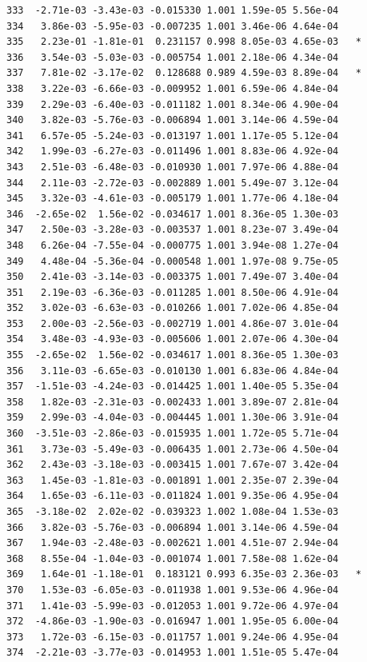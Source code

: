 \documentclass[
  letterpaper,
  DIV=11,
  numbers=noendperiod]{scrartcl}
\begin{document}
\begin{verbatim}
333  -2.71e-03 -3.43e-03 -0.015330 1.001 1.59e-05 5.56e-04    
334   3.86e-03 -5.95e-03 -0.007235 1.001 3.46e-06 4.64e-04    
335   2.23e-01 -1.81e-01  0.231157 0.998 8.05e-03 4.65e-03   *
336   3.54e-03 -5.03e-03 -0.005754 1.001 2.18e-06 4.34e-04    
337   7.81e-02 -3.17e-02  0.128688 0.989 4.59e-03 8.89e-04   *
338   3.22e-03 -6.66e-03 -0.009952 1.001 6.59e-06 4.84e-04    
339   2.29e-03 -6.40e-03 -0.011182 1.001 8.34e-06 4.90e-04    
340   3.82e-03 -5.76e-03 -0.006894 1.001 3.14e-06 4.59e-04    
341   6.57e-05 -5.24e-03 -0.013197 1.001 1.17e-05 5.12e-04    
342   1.99e-03 -6.27e-03 -0.011496 1.001 8.83e-06 4.92e-04    
343   2.51e-03 -6.48e-03 -0.010930 1.001 7.97e-06 4.88e-04    
344   2.11e-03 -2.72e-03 -0.002889 1.001 5.49e-07 3.12e-04    
345   3.32e-03 -4.61e-03 -0.005179 1.001 1.77e-06 4.18e-04    
346  -2.65e-02  1.56e-02 -0.034617 1.001 8.36e-05 1.30e-03    
347   2.50e-03 -3.28e-03 -0.003537 1.001 8.23e-07 3.49e-04    
348   6.26e-04 -7.55e-04 -0.000775 1.001 3.94e-08 1.27e-04    
349   4.48e-04 -5.36e-04 -0.000548 1.001 1.97e-08 9.75e-05    
350   2.41e-03 -3.14e-03 -0.003375 1.001 7.49e-07 3.40e-04    
351   2.19e-03 -6.36e-03 -0.011285 1.001 8.50e-06 4.91e-04    
352   3.02e-03 -6.63e-03 -0.010266 1.001 7.02e-06 4.85e-04    
353   2.00e-03 -2.56e-03 -0.002719 1.001 4.86e-07 3.01e-04    
354   3.48e-03 -4.93e-03 -0.005606 1.001 2.07e-06 4.30e-04    
355  -2.65e-02  1.56e-02 -0.034617 1.001 8.36e-05 1.30e-03    
356   3.11e-03 -6.65e-03 -0.010130 1.001 6.83e-06 4.84e-04    
357  -1.51e-03 -4.24e-03 -0.014425 1.001 1.40e-05 5.35e-04    
358   1.82e-03 -2.31e-03 -0.002433 1.001 3.89e-07 2.81e-04    
359   2.99e-03 -4.04e-03 -0.004445 1.001 1.30e-06 3.91e-04    
360  -3.51e-03 -2.86e-03 -0.015935 1.001 1.72e-05 5.71e-04    
361   3.73e-03 -5.49e-03 -0.006435 1.001 2.73e-06 4.50e-04    
362   2.43e-03 -3.18e-03 -0.003415 1.001 7.67e-07 3.42e-04    
363   1.45e-03 -1.81e-03 -0.001891 1.001 2.35e-07 2.39e-04    
364   1.65e-03 -6.11e-03 -0.011824 1.001 9.35e-06 4.95e-04    
365  -3.18e-02  2.02e-02 -0.039323 1.002 1.08e-04 1.53e-03    
366   3.82e-03 -5.76e-03 -0.006894 1.001 3.14e-06 4.59e-04    
367   1.94e-03 -2.48e-03 -0.002621 1.001 4.51e-07 2.94e-04    
368   8.55e-04 -1.04e-03 -0.001074 1.001 7.58e-08 1.62e-04    
369   1.64e-01 -1.18e-01  0.183121 0.993 6.35e-03 2.36e-03   *
370   1.53e-03 -6.05e-03 -0.011938 1.001 9.53e-06 4.96e-04    
371   1.41e-03 -5.99e-03 -0.012053 1.001 9.72e-06 4.97e-04    
372  -4.86e-03 -1.90e-03 -0.016947 1.001 1.95e-05 6.00e-04    
373   1.72e-03 -6.15e-03 -0.011757 1.001 9.24e-06 4.95e-04    
374  -2.21e-03 -3.77e-03 -0.014953 1.001 1.51e-05 5.47e-04    

\end{verbatim}
\end{document}
